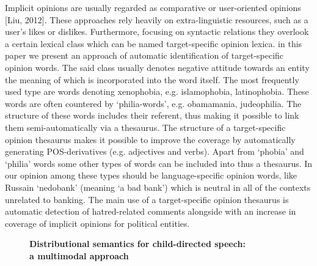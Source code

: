 \documentclass[10pt, a4paper, twopage, headinclude, footinclude, BCOR5mm]{book}
\begin{document}
\begin{table}[t!]
\end{table} 
\noindent
Implicit opinions are usually regarded as comparative or user-oriented opinions [Liu, 2012]. These approaches rely heavily on extra-linguistic resources, such as a user's likes or dislikes. Furthermore, focusing on syntactic relations they overlook a certain lexical class which can be named target-specific opinion lexica. in this paper we present an approach of automatic identification of target-specific opinion words. The said class usually denotes negative attitude towards an entity the meaning of which is incorporated into the word itself. The most frequently used type are words denoting xenophobia, e.g. islamophobia, latinophobia. These words are often countered by `philia-words', e.g. obamamania, judeophilia. The structure of these words includes their referent, thus making it possible to link them semi-automatically via a thesaurus. The structure of a target-specific opinion thesaurus makes it possible to improve the coverage by automatically generating POS-derivatives (e.g. adjectives and verbs). Apart from `phobia' and `philia' words some other types of words can be included into thus a thesaurus. In our opinion among these types should be language-specific opinion words, like Russain `nedobank' (meaning `a bad bank') which is neutral in all of the contexts unrelated to banking. The main use of a target-specific opinion thesaurus is automatic detection of hatred-related comments alongside with an increase in coverage of implicit opinions for political entities.  

\newpage

\begin{figure}[t!]
\centering
\large\textbf{Distributional semantics for child-directed speech: \\ a multimodal approach}
\vspace*{0.5cm}
\end{figure}
\end{document}
